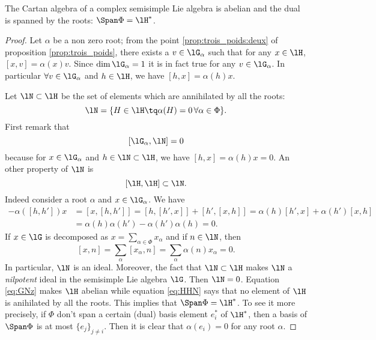 \begin{theorem}\label{tho:Phi_base}
The Cartan algebra of a complex semisimple Lie algebra is abelian and the dual is spanned by the roots: \( \Span\Phi=\lH^*\).
\end{theorem}

\begin{proof}
Let $\alpha$ be a non zero root; from the point \ref{prop:trois_poids:deux} of proposition \ref{prop:trois_poids}, there exists a $v\in\lG_{\alpha}$ such that for any $x\in\lH$, $[x,v]=\alpha(x)v$. Since $\dim\lG_{\alpha}=1$ it is in fact true for any $v\in\lG_{\alpha}$. In particular $\forall v\in\lG_{\alpha}$ and $h\in\lH$, we have $[h,x]=\alpha(h)x$.

Let $\lN\subset\lH$ be the set of elements which are annihilated by all the roots:
\begin{equation}
    \lN=\{ H\in\lH\tq\alpha(H)=0\,\forall \alpha\in\Phi \}.
\end{equation}
First remark that 
\begin{equation}\label{eq:GNz}
[\lG_{\alpha},\lN]=0
\end{equation}
because for $x\in\lG_{\alpha}$ and $h\in\lN\subset\lH$, we have $[h,x]=\alpha(h)x=0$. An other property of $\lN$ is
\begin{equation}\label{eq:HHN}
[\lH,\lH]\subset\lN.
\end{equation}
Indeed consider a root $\alpha$ and $x\in\lG_{\alpha}$. We have
\begin{equation}
\begin{split}
-\alpha([h,h'])x&=[x,[h,h']]
=[h,[h',x]]+[h',[x,h]]
=\alpha(h)[h',x]+\alpha(h')[x,h]\\
&=\alpha(h)\alpha(h')-\alpha(h')\alpha(h)
=0.
\end{split}
\end{equation}
If $x\in\lG$ is decomposed as $x=\sum_{\alpha\in\Phi}x_{\alpha}$ and if $n\in\lN$, then
\[
[x,n]=\sum_{\alpha}[x_{\alpha},n]=\sum_{\alpha}\alpha(n)x_{\alpha}=0.
\]
In particular, $\lN$ is an ideal. Moreover, the fact that $\lN\subset\lH$ makes $\lN$ a \emph{nilpotent} ideal in the semisimple Lie algebra $\lG$. Then $\lN=0$. Equation \eqref{eq:GNz} makes $\lH$ abelian while equation \eqref{eq:HHN} says that no element of $\lH$ is anihilated by all the roots. This implies that $\Span\Phi=\lH^*$. To see it more precisely, if $\Phi$ don't span a certain (dual) basis element $e_i^*$ of $\lH^*$, then a basis of $\Span\Phi$ is at most $\{e_j\}_{j\neq i}$. Then it is clear that $\alpha(e_i)=0$ for any root $\alpha$.
\end{proof}


